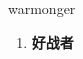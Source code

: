 
\begin{frame}
{\huge warmonger}
\begin{center}
\begin{enumerate}\Large
  \item \textbf{好战者}
\end{enumerate}
\end{center}
\end{frame}
